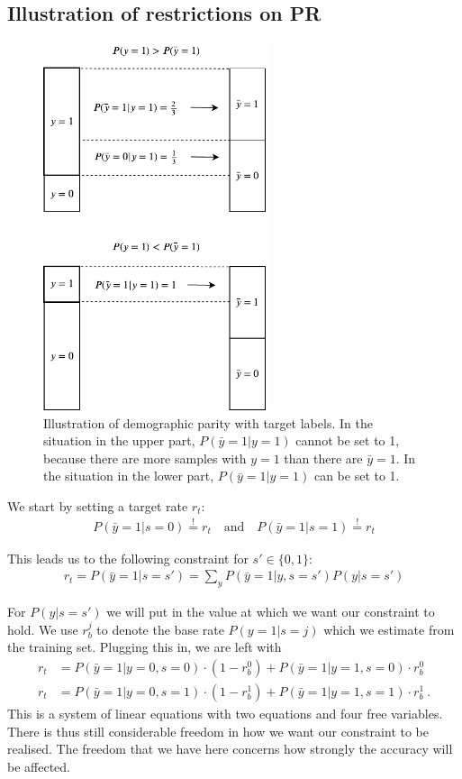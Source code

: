 \subsection{Illustration of restrictions on PR}
\begin{figure}[t]
  \centering
  \includegraphics[width=0.6\textwidth]{paper1/figures/label_shift.pdf}
  \caption{%
    Illustration of demographic parity with target labels.
    In the situation in the upper part, $P(\bar{y}=1|y=1)$ cannot be set to 1,
    because there are more samples with $y=1$ than there are $\bar{y}=1$.
    In the situation in the lower part, $P(\bar{y}=1|y=1)$ can be set to 1.
  }%
  \label{fig:shift}
\end{figure}%
We start by setting a target rate $r_t$:
\begin{align}
  P(\bar{y}=1|s=0) \overset{!}{=} r_t \quad\text{and}\quad P(\bar{y}=1|s=1) \overset{!}{=} r_t
\end{align}

This leads us to the following constraint for $s\prime\in\{0, 1\}$:
\begin{align}
  r_t = P(\bar{y}=1|s=s\prime)= \sum\limits_y P(\bar{y}=1|y,s=s\prime) P(y|s=s\prime)
\end{align}

For $P(y|s=s\prime)$ we will put in the value at which we want our constraint to hold.
We use $r_b^j$ to denote the base rate $P(y=1|s=j)$ which we estimate from the training set.
Plugging this in, we are left with
\begin{align}
  r_t &= P(\bar{y}=1|y=0,s=0) \cdot (1-r_b^0) +P(\bar{y}=1|y=1,s=0) \cdot r_b^0 \\
  r_t &= P(\bar{y}=1|y=0,s=1) \cdot (1-r_b^1) +P(\bar{y}=1|y=1,s=1) \cdot r_b^1~.
\end{align}
This is a system of linear equations with two equations and four free variables.
There is thus still considerable freedom in how we want our constraint to be realised.
The freedom that we have here concerns how strongly the accuracy will be affected.

